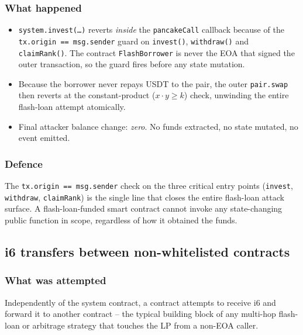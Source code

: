 \documentclass[11pt,a4paper]{article}
\begin{document}
\subsubsection*{What happened}

\begin{itemize}[leftmargin=*]
    \item \texttt{system.invest(\dots)} reverts \emph{inside} the
          \texttt{pancakeCall} callback because of the
          \texttt{tx.origin == msg.sender} guard on \texttt{invest()},
          \texttt{withdraw()} and \texttt{claimRank()}. The contract
          \texttt{FlashBorrower} is never the EOA that signed the outer
          transaction, so the guard fires before any state mutation.
    \item Because the borrower never repays USDT to the pair, the outer
          \texttt{pair.swap} then reverts at the constant-product
          (\(x\cdot y \geq k\)) check, unwinding the entire flash-loan
          attempt atomically.
    \item Final attacker balance change: \emph{zero}. No funds extracted, no
          state mutated, no event emitted.
\end{itemize}

\subsubsection*{Defence}

The \texttt{tx.origin == msg.sender} check on the three critical entry
points (\texttt{invest}, \texttt{withdraw}, \texttt{claimRank}) is the
single line that closes the entire flash-loan attack surface. A
flash-loan-funded smart contract cannot invoke any state-changing public
function in scope, regardless of how it obtained the funds.

\subsection{i6 transfers between non-whitelisted contracts}

\subsubsection*{What was attempted}

Independently of the system contract, a contract attempts to receive i6 and
forward it to another contract -- the typical building block of any
multi-hop flash-loan or arbitrage strategy that touches the LP from a
non-EOA caller.
\end{document}
